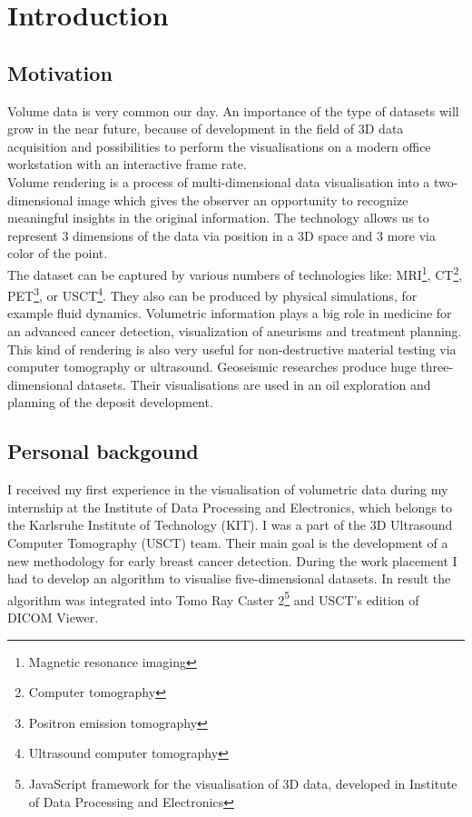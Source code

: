 \documentclass[english, 11pt]{report}
\begin{document}
\newpage

\tableofcontents

\chapter{Introduction}

\section{Motivation}

Volume data is very common our day. An importance of the type of datasets will grow in the near future, because of development in the field of 3D data acquisition and possibilities to perform the visualisations on a modern office workstation with an interactive frame rate.\\

Volume rendering is a process of multi-dimensional data visualisation into a two-dimensional image which gives the observer an opportunity to recognize meaningful insights in the original information. The technology allows us to represent 3 dimensions of the data via position in a 3D space and 3 more via color of the point.\\

The dataset can be captured by various numbers of technologies like: MRI\footnote{Magnetic resonance imaging}, CT\footnote{Computer tomography}, PET\footnote{Positron emission tomography}, or USCT\footnote{Ultrasound computer tomography}. They also can be produced by physical simulations, for example fluid dynamics. Volumetric information plays a big role in medicine for an advanced cancer detection, visualization of aneurisms and treatment planning. This kind of rendering is also very useful for non-destructive material testing via computer tomography or ultrasound. Geoseismic researches produce huge three-dimensional datasets. Their visualisations are used in an oil exploration and planning of the deposit development.\\

\section{Personal backgound}

I received my first experience in the visualisation of volumetric data during my internship at the Institute of Data Processing and Electronics, which belongs to the Karlsruhe Institute of Technology (KIT). I was a part of the 3D Ultrasound Computer Tomography (USCT) team. Their main goal is the development of a new methodology for early breast cancer detection. During the work placement I had to develop an algorithm to visualise five-dimensional datasets. In result the algorithm was integrated into Tomo Ray Caster 2\footnote{JavaScript framework for the visualisation of 3D data, developed in Institute of Data Processing and Electronics} and USCT's edition of DICOM Viewer.\\
\end{document}
